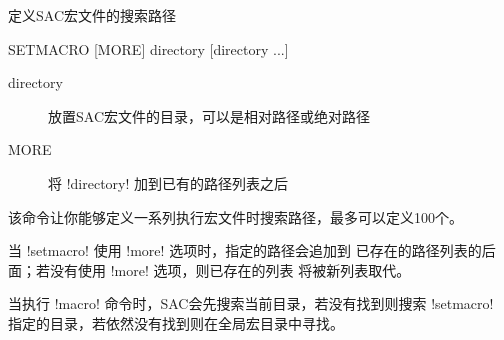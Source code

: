 \label{cmd:setmacro}

定义SAC宏文件的搜索路径

\begin{SACSTX}
SETMACRO [MORE] directory [directory ...]
\end{SACSTX}

\begin{description}
\item [directory] 放置SAC宏文件的目录，可以是相对路径或绝对路径
\item [MORE] 将 !directory! 加到已有的路径列表之后
\end{description}

该命令让你能够定义一系列执行宏文件时搜索路径，最多可以定义100个。

当 !setmacro! 使用 !more! 选项时，指定的路径会追加到
已存在的路径列表的后面；若没有使用 !more! 选项，则已存在的列表
将被新列表取代。

当执行 !macro! 命令时，SAC会先搜索当前目录，若没有找到则搜索
!setmacro! 指定的目录，若依然没有找到则在全局宏目录中寻找。
